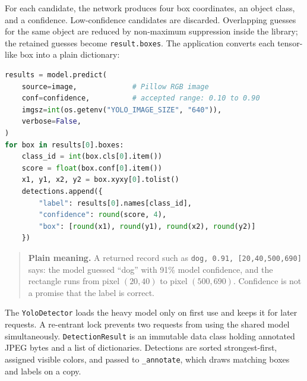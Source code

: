 \documentclass[12pt,a4paper,openany]{report}
\newcommand{\plainmeaning}[1]{%
  \begin{quote}
    \color{navy}\textbf{Plain meaning.} #1
  \end{quote}
}
\newcommand{\sourcepath}[1]{\texttt{#1}}
\begin{document}
For each candidate, the network produces four box coordinates, an object class,
and a confidence. Low-confidence candidates are discarded. Overlapping guesses
for the same object are reduced by non-maximum suppression inside the library;
the retained guesses become \texttt{result.boxes}. The application converts
each tensor-like box into a plain dictionary:

\begin{lstlisting}[language=Python,caption={Inference and result conversion from \sourcepath{cnn\_object\_detector/detector.py}.}]
results = model.predict(
    source=image,             # Pillow RGB image
    conf=confidence,          # accepted range: 0.10 to 0.90
    imgsz=int(os.getenv("YOLO_IMAGE_SIZE", "640")),
    verbose=False,
)
for box in results[0].boxes:
    class_id = int(box.cls[0].item())
    score = float(box.conf[0].item())
    x1, y1, x2, y2 = box.xyxy[0].tolist()
    detections.append({
        "label": results[0].names[class_id],
        "confidence": round(score, 4),
        "box": [round(x1), round(y1), round(x2), round(y2)]
    })
\end{lstlisting}

\plainmeaning{A returned record such as \texttt{dog, 0.91,
[20,40,500,690]} says: the model guessed ``dog'' with 91\% model confidence,
and the rectangle runs from pixel $(20,40)$ to pixel $(500,690)$. Confidence is
not a promise that the label is correct.}

The \texttt{YoloDetector} loads the heavy model only on first use and keeps it
for later requests. A re-entrant lock prevents two requests from using the
shared model simultaneously. \texttt{DetectionResult} is an immutable data
class holding annotated JPEG bytes and a list of dictionaries. Detections are
sorted strongest-first, assigned visible colors, and passed to
\texttt{\_annotate}, which draws matching boxes and labels on a copy.
\end{document}
